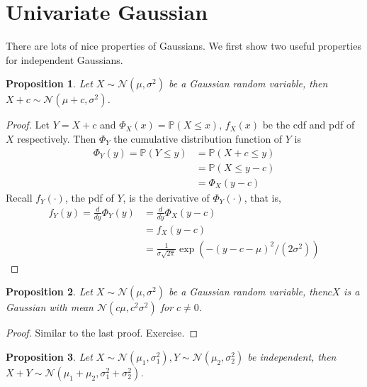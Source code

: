 \documentclass{article}
\newtheorem{proposition}{Proposition}
\DeclareMathOperator*{\1}{\mathbbm{1}}
\newcommand{\Prob}[1]{\mathbb{P}( #1 )}
\newcommand{\cN}{\mathcal{N}}
\theoremstyle{definition}
\theoremstyle{remark}
\begin{document}
  \section{Univariate Gaussian}
  There are lots of nice properties of Gaussians. We first show two useful properties for independent Gaussians. 
  \begin{proposition}
    Let $X\sim \cN(\mu, \sigma^2)$ be a Gaussian random variable, then $X+c \sim \cN(\mu+c, \sigma^2)$.
  \end{proposition}
  \begin{proof}
    Let $Y=X+c$ and $\Phi_X(x) = \Prob{X\le x}$, $f_X(x)$ be the cdf and pdf of $X$ respectively. Then $\Phi_Y$ the cumulative distribution function of $Y$ is
    \begin{align*}
      \Phi_Y(y) = \Prob{Y \le y} &= \Prob{X+c\le y}\\
      &=\Prob{X\le y-c}\\
      &=\Phi_X(y-c)
    \end{align*}
    Recall $f_Y(\cdot)$, the pdf  of $Y$, is the derivative of $\Phi_Y(\cdot)$, that is, 
    \begin{align*}
      f_Y(y)=\frac{d}{dy}\Phi_Y(y) &= \frac{d}{dy} \Phi_X(y-c)\\
      &= f_X(y-c)\\
      &=\frac{1}{\sigma\sqrt{2\pi}}\exp(-(y-c-\mu)^2 / (2\sigma^{2}))
    \end{align*}
  \end{proof}
  \begin{proposition}\label{prop:mul_gaussian}
    Let $X\sim \cN(\mu, \sigma^2)$ be a Gaussian random variable, then$cX$ is a Gaussian with mean $\mathcal N(c\mu, c^2\sigma^2)$ for $c\neq 0$.
  \end{proposition}
  \begin{proof}
    Similar to the last proof. Exercise.
  \end{proof}
  \begin{proposition}\label{prop:sum_gaussian}
    Let $X\sim \cN(\mu_1, \sigma_1^2),Y\sim \cN(\mu_2, \sigma_2^2)$ be independent, then $X+Y\sim \cN(\mu_1+\mu_2, \sigma_1^2+\sigma_2^2)$.
  \end{proposition}
\end{document}
